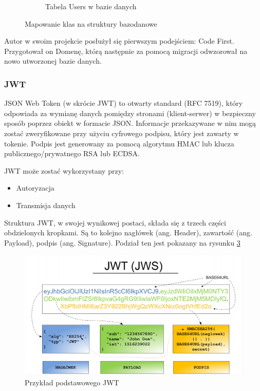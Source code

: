 \documentclass[12pt]{article}
\numberwithin{figure}{section}
\begin{document}
\begin{figure}[H]
\begin{subfigure}{.4\textwidth}
      \caption{Tabela Users w bazie danych}
      \label{fig:ef-db}
    \end{subfigure}
    \caption{Mapowanie klas na struktury bazodanowe}
    \label{fig:ef}
    \end{figure}
    
Autor w swoim projekcie posłużył się pierwszym podejściem: Code First. Przygotował on Domenę, którą następnie za pomocą migracji odwzorował na nowo utworzonej bazie danych. 

    \subsubsection{JWT}
    JSON Web Token (w skrócie JWT) to otwarty standard (RFC 7519), który odpowiada za wymianę danych pomiędzy stronami (klient-serwer) w bezpieczny sposób poprzez obiekt w formacie JSON. Informacje przekazywane w nim mogą zostać zweryfikowane przy użyciu cyfrowego podpisu, który jest zawarty w tokenie. Podpis jest generowany za pomocą algorytmu HMAC lub klucza publicznego/prywatnego RSA lub ECDSA.
    
    JWT może zostać wykorzystany przy:
    \begin{itemize}
        \item Autoryzacja
        \item Transmisja danych
    \end{itemize}
    
    Struktura JWT, w swojej wynikowej postaci, składa się z trzech części obdzielonych kropkami. Są to kolejno nagłówek (ang. Header), zawartość (ang. Payload), podpis (ang. Signature). Podział ten jest pokazany na rysunku \ref{fig:jwt}
    
    \begin{figure}[H] 
     	\centering
    	\includegraphics[width=1\textwidth]{images/chapter_3/jwt.png}
    	\caption{Przykład podstawowego JWT \cite{sekurak-jwt}}
    	\label{fig:jwt}
    \end{figure}
    
\end{document}
